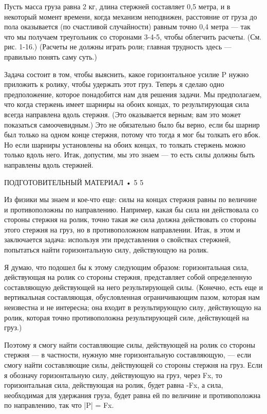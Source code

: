\documentclass[10pt,oneside]{article}
\begin{document}
Пусть масса груза равна 2 кг, длина стержней составляет 0,5 метра, и в некоторый момент времени, когда механизм неподвижен, расстояние от груза до пола оказывается (по счастливой случайности) равным точно 0,4 метра --- так что мы получаем треугольник со сторонами 3-4-5, чтобы облегчить расчеты. (См. рис. 1-16.) (Расчеты не должны играть роли; главная трудность здесь --- правильно понять саму суть.)\par

Задача состоит в том, чтобы выяснить, какое горизонтальное усилие P нужно приложить к ролику, чтобы удержать этот груз. Теперь я сделаю одно предположение, которое понадобится нам для решения задачи. Мы предполагаем, что когда стержень имеет шарниры на обоих концах, то результирующая сила всегда направлена вдоль стержня. (Это оказывается верным; вам это может показаться самоочевидным.) Это не обязательно было бы верно, если бы шарнир был только на одном конце стержня, потому что тогда я мог бы толкать его вбок. Но если шарниры установлены на обоих концах, то толкать стержень можно только вдоль него. Итак, допустим, мы это знаем --- то есть силы должны быть направлены вдоль стержней.\par

ПОДГОТОВИТЕЛЬНЫЙ МАТЕРИАЛ • 5 5\par

Из физики мы знаем и кое-что еще: силы на концах стержня равны по величине и противоположны по направлению. Например, какая бы сила ни действовала со стороны стержня на ролик, точно такая же сила должна действовать со стороны этого стержня на груз, но в противоположном направлении. Итак, в этом и заключается задача: используя эти представления о свойствах стержней, попытаться найти горизонтальную силу, действующую на ролик.\par

Я думаю, что подошел бы к этому следующим образом: горизонтальная сила, действующая на ролик со стороны стержня, представляет собой определенную составляющую действующей на него результирующей силы. (Конечно, есть еще и вертикальная составляющая, обусловленная ограничивающим пазом, которая нам неизвестна и не интересна; она входит в результирующую силу, действующую на ролик, которая точно противоположна результирующей силе, действующей на груз.)\par

Поэтому я смогу найти составляющие силы, действующей на ролик со стороны стержня --- в частности, нужную мне горизонтальную составляющую, --- если смогу найти составляющие силы, действующей со стороны стержня на груз. Если я обозначу горизонтальную силу, действующую на груз, через Fx, то горизонтальная сила, действующая на ролик, будет равна -Fx, а сила, необходимая для удержания груза, будет равна ей по величине и противоположна по направлению, так что |P| = Fx.\par
\end{document}
